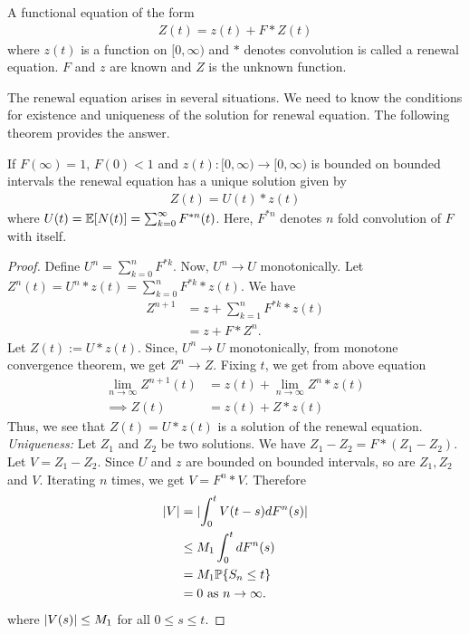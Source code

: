 \documentclass[all-lectures.tex]{subfiles}
\begin{document}
\begin{defn} A functional equation of the form 
\begin{align*}
Z(t) = z(t) + F*Z(t)
\end{align*}
where $z(t)$ is a function on $[0,\infty)$ and $*$ denotes convolution is called a renewal equation. $F$ and $z$ are known and $Z$ is the unknown function.
\end{defn}
The renewal equation arises in several situations. We need to know the conditions for existence and uniqueness of the solution for renewal equation. The following theorem provides the answer.
\begin{prop}
If $F(\infty) = 1$, $F(0) < 1$ and $z(t):[0,\infty) \rightarrow [0,\infty)$ is bounded on bounded intervals the renewal equation has a unique solution given by 
\begin{align*}
Z(t) = U(t) * z(t)
\end{align*}
where $U(t) = \mathbb{E}[N(t)] = \sum_{k=0}^\infty F^{*n}(t)$. Here, $F^{*n}$ denotes $n$ fold convolution of $F$ with itself.
\begin{proof}
Define $U^n = \sum_{k=0}^n F^{*k}$. Now, $U^n \to U$ monotonically. Let $Z^n(t) = U^n*z(t) = \sum_{k=0}^n F^{*k}*z(t)$. We have
\begin{align*}
Z^{n+1} &= z + \sum_{k=1}^n F^{*k}*z(t) \\
&= z + F * Z^n.
\end{align*}
Let  $Z(t) :=  U* z(t)$. Since, $U^n \to U$ monotonically, from monotone convergence theorem, we get $Z^n \to Z$. Fixing $t$, we get from above equation 
\begin{align*}
\lim_{n \to \infty} Z^{n+1}(t) &= z(t) + \lim_{n\to \infty} Z^n*z(t)\\
\implies Z(t) &= z(t) + Z*z(t)
\end{align*}
Thus, we see that $Z(t) = U*z(t)$ is a solution of the renewal equation.\\
\indent \textit{Uniqueness:} Let $Z_1$ and $Z_2$ be two solutions. We have $Z_1-Z_2 = F * (Z_1 - Z_2)$. Let $V = Z_1 - Z_2$. Since $U$ and $z$ are bounded on bounded intervals, so are $Z_1,Z_2$ and $V$. Iterating $n$ times, we get $V = F^n*V$. Therefore
\begin{align*}
\lvert V\rvert &= \lvert \int_0^t V(t-s) d F^n(s) \rvert \\
&\leq M_1 \int_0^t d F^n(s) \\
&= M_1 \mathbb{P}\{S_n \leq t\} \\
&= 0 \text{ as }n \to \infty.
\end{align*}
where $\lvert V(s)\rvert \leq M_1$ for all $0\leq s \leq t$.

\end{proof}
\end{prop}
\end{document}
